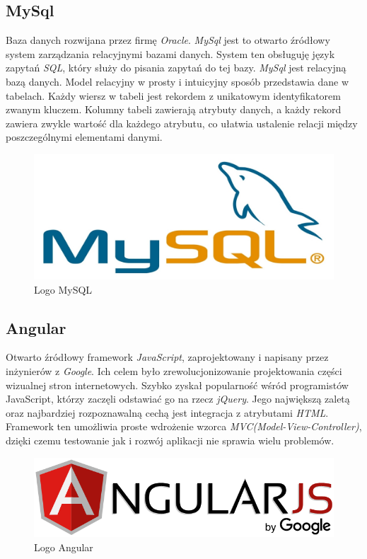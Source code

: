\documentclass[12pt,a4paper]{article}
\begin{document}
\subsection{MySql} 				%

\hspace*{0.7cm} Baza danych rozwijana przez firmę \textit{Oracle}. \textit{MySql} jest to otwarto źródłowy system zarządzania relacyjnymi bazami danych. System ten obsługuję język zapytań \textit{SQL}, który służy do pisania zapytań do tej bazy. \textit{MySql} jest relacyjną bazą danych. Model relacyjny w prosty i intuicyjny sposób przedstawia dane w tabelach. Każdy wiersz w tabeli jest rekordem z unikatowym identyfikatorem zwanym kluczem. Kolumny tabeli zawierają atrybuty danych, a każdy rekord zawiera zwykle wartość dla każdego atrybutu, co ułatwia ustalenie relacji między poszczególnymi elementami danymi.\newline
 
\begin{figure}[H]
	\centering
	\includegraphics[width=0.7\linewidth]{mysql-logo}
	\caption{Logo MySQL}
	\label{fig:mysql-logo}
\end{figure}

\subsection{Angular} 			%

\hspace*{0.7cm} Otwarto źródłowy framework \textit{JavaScript}, zaprojektowany i napisany przez inżynierów z \textit{Google}. Ich celem było zrewolucjonizowanie projektowania części wizualnej stron internetowych. Szybko zyskał popularność wśród programistów JavaScript, którzy zaczęli odstawiać go na rzecz \textit{jQuery}. Jego największą zaletą oraz najbardziej rozpoznawalną cechą jest integracja z atrybutami \textit{HTML}. Framework ten umożliwia proste wdrożenie wzorca \textit{MVC(Model-View-Controller)}, dzięki czemu testowanie jak i rozwój aplikacji nie sprawia wielu problemów.

\begin{figure}[H]
	\centering
	\includegraphics[width=0.7\linewidth]{AngularJS_logo}
	\caption{Logo Angular}
	\label{fig:angularjslogo}
\end{figure}
\end{document}
